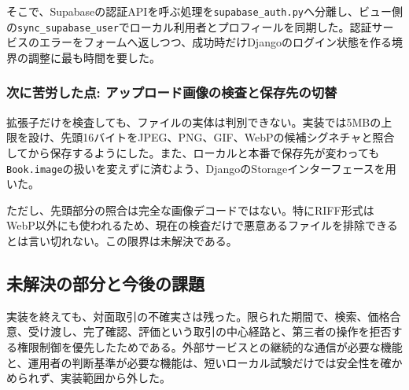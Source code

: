 \documentclass[11pt,a4paper]{jsarticle}
\begin{document}
そこで、Supabaseの認証APIを呼ぶ処理を\texttt{supabase\_auth.py}へ分離し、ビュー側の\texttt{sync\_supabase\_user}でローカル利用者とプロフィールを同期した。認証サービスのエラーをフォームへ返しつつ、成功時だけDjangoのログイン状態を作る境界の調整に最も時間を要した。

\subsubsection{次に苦労した点: アップロード画像の検査と保存先の切替}
拡張子だけを検査しても、ファイルの実体は判別できない。実装では5MBの上限を設け、先頭16バイトをJPEG、PNG、GIF、WebPの候補シグネチャと照合してから保存するようにした。また、ローカルと本番で保存先が変わっても\texttt{Book.image}の扱いを変えずに済むよう、DjangoのStorageインターフェースを用いた。

ただし、先頭部分の照合は完全な画像デコードではない。特にRIFF形式はWebP以外にも使われるため、現在の検査だけで悪意あるファイルを排除できるとは言い切れない。この限界は未解決である。

\subsection{未解決の部分と今後の課題}
実装を終えても、対面取引の不確実さは残った。限られた期間で、検索、価格合意、受け渡し、完了確認、評価という取引の中心経路と、第三者の操作を拒否する権限制御を優先したためである。外部サービスとの継続的な通信が必要な機能と、運用者の判断基準が必要な機能は、短いローカル試験だけでは安全性を確かめられず、実装範囲から外した。
\end{document}
